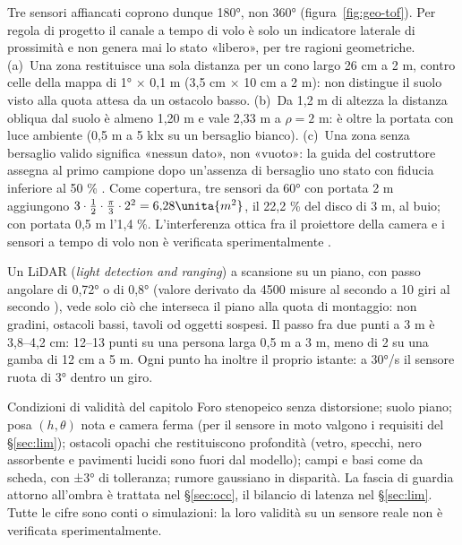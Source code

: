 Tre sensori affiancati coprono dunque 180°, non 360° (figura~\ref{fig:geo-tof}). Per regola di progetto il canale a tempo di volo è solo un indicatore laterale di prossimità e non genera mai lo stato «libero», per tre ragioni geometriche. (a)~Una zona restituisce una sola distanza per un cono largo 26 cm a 2 m, contro celle della mappa di 1° × 0,1 m (3,5 cm × 10 cm a 2 m): non distingue il suolo visto alla quota attesa da un ostacolo basso. (b)~Da 1,2 m di altezza la distanza obliqua dal suolo è almeno 1,20 m e vale 2,33 m a $\rho=2$ m: è oltre la portata con luce ambiente (0,5 m a 5 klx su un bersaglio bianco). (c)~Una zona senza bersaglio valido significa «nessun dato», non «vuoto»: la guida del costruttore assegna al primo campione dopo un'assenza di bersaglio uno stato con fiducia inferiore al 50 \% \cite{st-um3038}. Come copertura, tre sensori da 60° con portata 2 m aggiungono $3\cdot\tfrac12\cdot\tfrac{\pi}{3}\cdot2^2=6{,}28\unita{m^2}$, il 22,2 \% del disco di 3 m, al buio; con portata 0,5 m l'1,4 \%. L'interferenza ottica fra il proiettore della camera e i sensori a tempo di volo non è verificata sperimentalmente .

Un LiDAR (\emph{light detection and ranging}) a scansione su un piano, con passo angolare di 0,72° \cite{slamtec-rplidar-c1} o di 0,8° (valore derivato da 4500 misure al secondo a 10 giri al secondo \cite{ldrobot-ld19}), vede solo ciò che interseca il piano alla quota di montaggio: non gradini, ostacoli bassi, tavoli od oggetti sospesi. Il passo fra due punti a 3 m è 3,8--4,2 cm: 12--13 punti su una persona larga 0,5 m a 3 m, meno di 2 su una gamba di 12 cm a 5 m. Ogni punto ha inoltre il proprio istante: a 30°/s il sensore ruota di 3° dentro un giro. 

\begin{riquadro}{Condizioni di validità del capitolo}
Foro stenopeico senza distorsione; suolo piano; posa $(h,\theta)$ nota e camera ferma (per il sensore in moto valgono i requisiti del \S\ref{sec:lim}); ostacoli opachi che restituiscono profondità (vetro, specchi, nero assorbente e pavimenti lucidi sono fuori dal modello); campi e basi come da scheda, con ±3° di tolleranza; rumore gaussiano in disparità. La fascia di guardia attorno all'ombra è trattata nel \S\ref{sec:occ}, il bilancio di latenza nel \S\ref{sec:lim}. Tutte le cifre sono conti o simulazioni: la loro validità su un sensore reale non è verificata sperimentalmente.
\end{riquadro}
